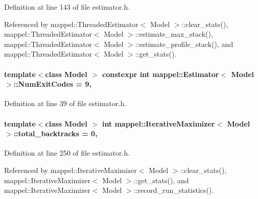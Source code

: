 Definition at line 143 of file estimator.\+h.



Referenced by mappel\+::\+Threaded\+Estimator$<$ Model $>$\+::clear\+\_\+stats(), mappel\+::\+Threaded\+Estimator$<$ Model $>$\+::estimate\+\_\+max\+\_\+stack(), mappel\+::\+Threaded\+Estimator$<$ Model $>$\+::estimate\+\_\+profile\+\_\+stack(), and mappel\+::\+Threaded\+Estimator$<$ Model $>$\+::get\+\_\+stats().

\paragraph[{\texorpdfstring{Num\+Exit\+Codes}{NumExitCodes}}]{\setlength{\rightskip}{0pt plus 5cm}template$<$class Model $>$ constexpr int {\bf mappel\+::\+Estimator}$<$ Model $>$\+::Num\+Exit\+Codes = 9\hspace{0.3cm}{\ttfamily [static]}, {\ttfamily [inherited]}}\hypertarget{classmappel_1_1Estimator_afcec036c4d78c12d427e0a733a00a48e}{}\label{classmappel_1_1Estimator_afcec036c4d78c12d427e0a733a00a48e}


Definition at line 39 of file estimator.\+h.

\paragraph[{\texorpdfstring{total\+\_\+backtracks}{total_backtracks}}]{\setlength{\rightskip}{0pt plus 5cm}template$<$class Model $>$ int {\bf mappel\+::\+Iterative\+Maximizer}$<$ Model $>$\+::total\+\_\+backtracks = 0\hspace{0.3cm}{\ttfamily [protected]}, {\ttfamily [inherited]}}\hypertarget{classmappel_1_1IterativeMaximizer_a752717a4e69ba7cd44a6167d0cbdb242}{}\label{classmappel_1_1IterativeMaximizer_a752717a4e69ba7cd44a6167d0cbdb242}


Definition at line 250 of file estimator.\+h.



Referenced by mappel\+::\+Iterative\+Maximizer$<$ Model $>$\+::clear\+\_\+stats(), mappel\+::\+Iterative\+Maximizer$<$ Model $>$\+::get\+\_\+stats(), and mappel\+::\+Iterative\+Maximizer$<$ Model $>$\+::record\+\_\+run\+\_\+statistics().

